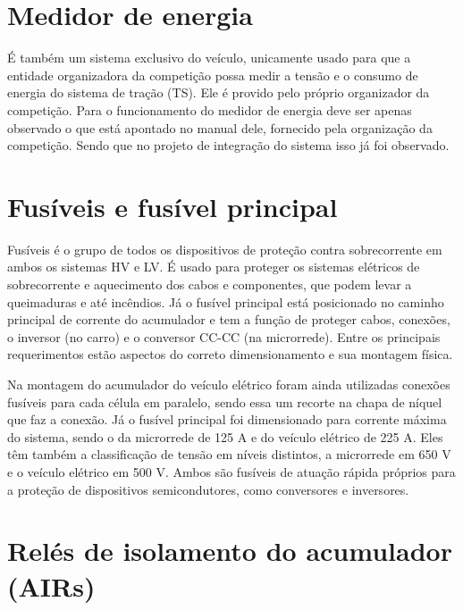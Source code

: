 
\section{Medidor de energia}

    É também um sistema exclusivo do veículo, unicamente usado para que a entidade organizadora da competição possa medir a tensão e o consumo de energia do sistema de tração (TS). Ele é provido pelo próprio organizador da competição. Para o funcionamento do medidor de energia deve ser apenas observado o que está apontado no manual dele, fornecido pela organização da competição. Sendo que no projeto de integração do sistema isso já foi observado.


\section{Fusíveis e fusível principal}

    Fusíveis é o grupo de todos os dispositivos de proteção contra sobrecorrente em ambos os sistemas HV e LV. É usado para proteger os sistemas elétricos de sobrecorrente e aquecimento dos cabos e componentes, que podem levar a queimaduras e até incêndios. Já o fusível principal está posicionado no caminho principal de corrente do acumulador e tem a função de proteger cabos, conexões, o inversor (no carro) e o conversor CC-CC (na microrrede). Entre os principais requerimentos estão aspectos do correto dimensionamento e sua montagem física. 

    Na montagem do acumulador do veículo elétrico foram ainda utilizadas conexões fusíveis para cada célula em paralelo, sendo essa um recorte na chapa de níquel que faz a conexão. Já o fusível principal foi dimensionado para corrente máxima do sistema, sendo o da microrrede de 125 A e do veículo elétrico de 225 A. Eles têm também a classificação de tensão em níveis distintos, a microrrede em 650 V e o veículo elétrico em 500 V. Ambos são fusíveis de atuação rápida próprios para a proteção de dispositivos semicondutores, como conversores e inversores.


\section{Relés de isolamento do acumulador (AIRs)}

